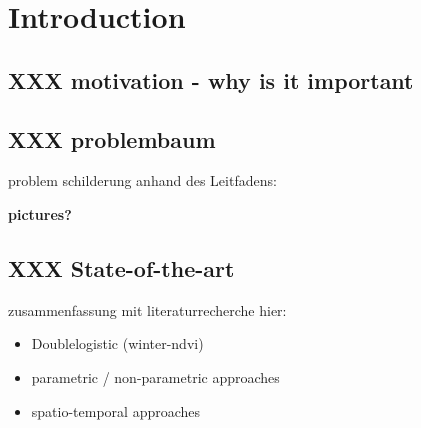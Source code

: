 \chapter{Introduction}

\section{XXX motivation - why is it important}

\section{XXX problembaum}
problem schilderung anhand des Leitfadens:

\textbf{pictures?}

\section{XXX State-of-the-art}
zusammenfassung mit literaturrecherche hier:
\begin{itemize}
    \item Doublelogistic (winter-ndvi)
    \item parametric / non-parametric approaches
    \item spatio-temporal approaches
\end{itemize}



